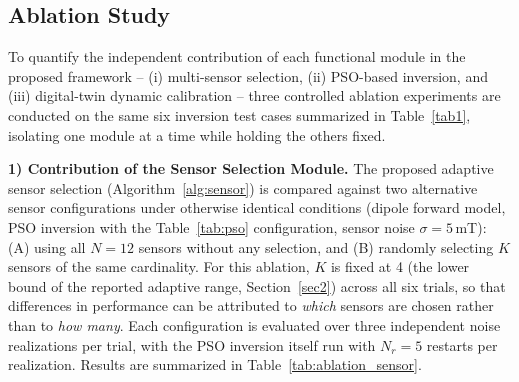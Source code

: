 
\subsection{Ablation Study}
\label{subsec:ablation}

To quantify the independent contribution of each functional module in
the proposed framework -- (i) multi-sensor selection, (ii) PSO-based
inversion, and (iii) digital-twin dynamic calibration -- three
controlled ablation experiments are conducted on the same six
inversion test cases summarized in Table~\ref{tab1}, isolating one
module at a time while holding the others fixed.

\textbf{1) Contribution of the Sensor Selection Module.}
The proposed adaptive sensor selection (Algorithm~\ref{alg:sensor}) is
compared against two alternative sensor configurations under otherwise
identical conditions (dipole forward model, PSO inversion with the
Table~\ref{tab:pso} configuration, sensor noise $\sigma = 5$\,mT): (A)
using all $N = 12$ sensors without any selection, and (B) randomly
selecting $K$ sensors of the same cardinality. For this ablation, $K$
is fixed at 4 (the lower bound of the reported adaptive range,
Section~\ref{sec2}) across all six trials, so that differences in
performance can be attributed to \emph{which} sensors are chosen rather
than to \emph{how many}. Each configuration is evaluated over three
independent noise realizations per trial, with the PSO inversion
itself run with $N_r = 5$ restarts per realization. Results are
summarized in Table~\ref{tab:ablation_sensor}.

